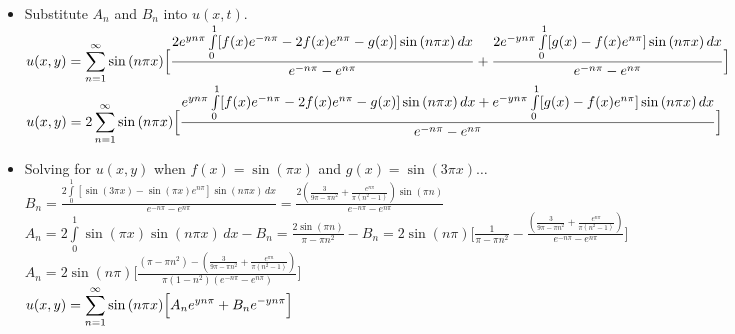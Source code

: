 \documentclass[10pt]{article}
\begin{document}
\begin{itemize}
    \subitem $ \displaystyle  B_{n} = \frac{2 \int \limits_{0}^{1} [g(x) - f(x)e^{n\pi}]\sin{(n\pi x)} \,dx }{e^{-n\pi} - e^{n\pi}} $ \\
    \subitem $ \displaystyle  A_{n} = 2 \int \limits_{0}^{1} f(x)\sin{(n\pi x)} \,dx - \frac{2 \int \limits_{0}^{1} [g(x) - f(x)e^{n\pi}]\sin{(n\pi x)} \,dx }{e^{-n\pi} - e^{n\pi}} $
    \subitem $ \displaystyle  A_{n} = \frac{2 \int \limits_{0}^{1} [f(x)[e^{-n\pi} - e^{n\pi}] - g(x) - f(x)e^{n\pi}]\sin{(n\pi x)} \,dx }{e^{-n\pi} - e^{n\pi}} $ \\
    \subitem $ \displaystyle  A_{n} = \frac{2 \int \limits_{0}^{1} [f(x)e^{-n\pi} - 2f(x)e^{n\pi} - g(x)]\sin{(n\pi x)} \,dx }{e^{-n\pi} - e^{n\pi}} $ \\
    \item Substitute $ A_n $ and $ B_n $ into $ u(x,t) $. \\
    \subitem $ \displaystyle u(x,y) = \sum \limits_{n=1}^{\infty} \sin{(n\pi x)}\Bigl[\frac{2e^{yn\pi } \int \limits_{0}^{1} [f(x)e^{-n\pi} - 2f(x)e^{n\pi} - g(x)]\sin{(n\pi x)} \,dx }{e^{-n\pi} - e^{n\pi}} + \frac{2e^{-yn\pi } \int \limits_{0}^{1} [g(x) - f(x)e^{n\pi}]\sin{(n\pi x)} \,dx }{e^{-n\pi} - e^{n\pi}}\Bigr] $ \\
    \subitem $ \displaystyle u(x,y) = 2\sum \limits_{n=1}^{\infty} \sin{(n\pi x)}\Bigl[\frac{e^{yn\pi } \int \limits_{0}^{1} [f(x)e^{-n\pi} - 2f(x)e^{n\pi} - g(x)]\sin{(n\pi x)} \,dx + e^{-yn\pi } \int \limits_{0}^{1} [g(x) - f(x)e^{n\pi}]\sin{(n\pi x)} \,dx }{e^{-n\pi} - e^{n\pi}}\Bigr] $ \\
    \item Solving for $ u(x,y) $ when $ f(x) = \sin{(\pi x)} $ and $ g(x) = \sin{(3\pi x)} \dots$ \\
    \subitem $ \displaystyle  B_{n} = \frac{2 \int \limits_{0}^{1} [\sin{(3\pi x)} - \sin{(\pi x)}e^{n\pi}]\sin{(n\pi x)} \,dx }{e^{-n\pi} - e^{n\pi}} = \frac{2 \left(\frac{3}{9 \pi -\pi  n^2}+\frac{e^{n\pi}}{\pi  \left(n^2-1\right)}\right) \sin (\pi  n)}{e^{-n\pi}-e^{n\pi}} $ \\
    \subitem $ \displaystyle A_{n} = 2 \int \limits_{0}^{1} \sin{(\pi x)} \sin{(n\pi x)} \,dx - B_{n} = \frac{2 \sin (\pi  n)}{\pi -\pi  n^2} - B_n = 2\sin{(n\pi)} \Biggl[ \frac{1}{\pi -\pi  n^2} - \frac{ \left(\frac{3}{9 \pi -\pi  n^2}+\frac{e^{n\pi}}{\pi  \left(n^2-1\right)}\right)}{e^{-n\pi}-e^{n\pi}} \Biggr] $ \\
    \subitem $ \displaystyle A_{n} = 2\sin{(n\pi)} \Biggl[ \frac{(\pi -\pi  n^2) - \left(\frac{3}{9 \pi -\pi  n^2}+\frac{e^{\pi  n}}{\pi  \left(n^2-1\right)}\right)}{\pi(1 - n^2)(e^{-n\pi}-e^{n\pi})} \Biggr] $ \\
    \subitem $ \displaystyle u(x,y) = \sum \limits_{n=1}^{\infty} \sin{(n\pi x)}\Bigl[A_{n}e^{yn\pi } + B_{n}e^{-yn\pi }\Bigr] $ \\
\end{itemize}
\end{document}
